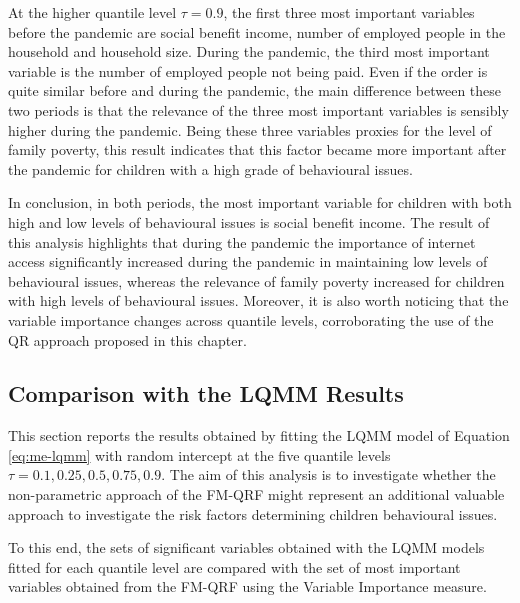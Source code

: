 \noindent At the higher quantile level $\tau=0.9$, the first three most important variables before the pandemic are social benefit income, number of employed people in the household and household size. During the pandemic, the third most important variable is the number of employed people not being paid. Even if the order is quite similar before and during the pandemic, the main difference between these two periods is that the relevance of the three most important variables is sensibly higher during the pandemic. Being these three variables proxies for the level of family poverty, this result indicates that this factor became more important after the pandemic for children with a high grade of behavioural issues.

\vspace{0.15in}

\noindent In conclusion, in both periods, the most important variable for children with both high and low levels of behavioural issues is social benefit income. The result of this analysis highlights that during the pandemic the importance of internet access significantly increased during the pandemic in maintaining low levels of behavioural issues, whereas the relevance of family poverty increased for children with high levels of behavioural issues.
Moreover, it is also worth noticing that the variable importance changes across quantile levels, corroborating the use of the QR approach proposed in this chapter. 


\subsection{Comparison with the LQMM Results}

This section reports the results obtained by fitting the LQMM model of Equation \eqref{eq:me-lqmm} with random intercept at the five quantile levels $\tau=0.1, 0.25, 0.5, 0.75, 0.9$. The aim of this analysis is to investigate whether the non-parametric approach of the FM-QRF might represent an additional valuable approach to investigate the risk factors determining children behavioural issues. 

\vspace{0.15in}

\noindent To this end, the sets of significant variables obtained with the LQMM models fitted for each quantile level are compared with the set of most important variables obtained from the FM-QRF using the Variable Importance measure. 
\vspace{0.15in}

